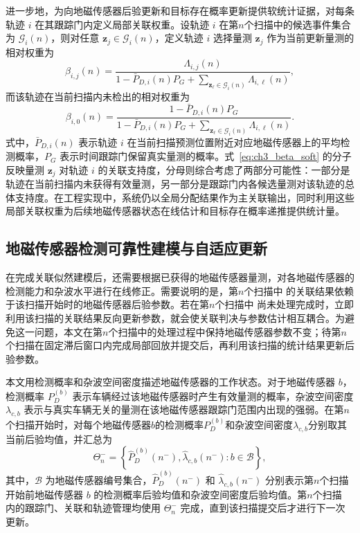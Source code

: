 \documentclass{xdupgthesis}
\begin{document}
进一步地，为向地磁传感器后验更新和目标存在概率更新提供软统计证据，对每条轨迹 $i$ 在其跟踪门内定义局部关联权重。设轨迹 $i$ 在第$n$个扫描中的候选事件集合为 $\mathcal G_i(n)$，则对任意 $\mathbf z_j\in\mathcal G_i(n)$，定义轨迹 $i$ 选择量测 $\mathbf z_j$ 作为当前更新量测的相对权重为
\begin{equation}
	\beta_{i,j}(n)=
	\frac{\Lambda_{i,j}(n)}{1-\bar P_{D,i}(n)P_G+\sum\limits_{\mathbf z_\ell\in\mathcal G_i(n)}\Lambda_{i,\ell}(n)},
	\label{eq:ch3_beta_soft}
\end{equation}
而该轨迹在当前扫描内未检出的相对权重为
\begin{equation}
	\beta_{i,0}(n)=
	\frac{1-\bar P_{D,i}(n)P_G}{1-\bar P_{D,i}(n)P_G+\sum\limits_{\mathbf z_\ell\in\mathcal G_i(n)}\Lambda_{i,\ell}(n)}.
	\label{eq:ch3_beta_miss}
\end{equation}
式中，$\bar P_{D,i}(n)$ 表示轨迹 $i$ 在当前扫描预测位置附近对应地磁传感器上的平均检测概率，$P_G$ 表示时间跟踪门保留真实量测的概率。式~\eqref{eq:ch3_beta_soft} 的分子反映量测 $\mathbf z_j$ 对轨迹 $i$ 的关联支持度，分母则综合考虑了两部分可能性：一部分是轨迹在当前扫描内未获得有效量测，另一部分是跟踪门内各候选量测对该轨迹的总体支持度。在工程实现中，系统仍以全局分配结果作为主关联输出，同时利用这些局部关联权重为后续地磁传感器状态在线估计和目标存在概率递推提供统计量。

\subsection{地磁传感器检测可靠性建模与自适应更新}
\label{subsec:ch3_node_stats}

在完成关联似然建模后，还需要根据已获得的地磁传感器量测，对各地磁传感器的检测能力和杂波水平进行在线修正。需要说明的是，第$n$个扫描中 的关联结果依赖于该扫描开始时的地磁传感器后验参数。若在第$n$个扫描中 尚未处理完成时，立即利用该扫描的关联结果反向更新参数，就会使关联判决与参数估计相互耦合。为避免这一问题，本文在第$n$个扫描中的处理过程中保持地磁传感器参数不变；待第$n$个扫描在固定滞后窗口内完成局部回放并提交后，再利用该扫描的统计结果更新后验参数。

本文用检测概率和杂波空间密度描述地磁传感器的工作状态。对于地磁传感器 $b$，检测概率 $P_D^{(b)}$ 表示车辆经过该地磁传感器时产生有效量测的概率，杂波空间密度 $\lambda_{c,b}$ 表示与真实车辆无关的量测在该地磁传感器跟踪门范围内出现的强弱。在第$n$个扫描开始时，对每个地磁传感器$b$的检测概率$P_D^{(b)}$和杂波空间密度$\lambda_{c,b}$分别取其当前后验均值，并汇总为
\begin{equation}
	\Theta_n^{-}
	=
	\left\{
	\hat P_D^{(b)}(n^-),\hat\lambda_{c,b}(n^-):b\in\mathcal B
	\right\},
	\label{eq:ch3_theta_frozen}
\end{equation}
其中，$\mathcal B$ 为地磁传感器编号集合，$\hat P_D^{(b)}(n^-)$ 和 $\hat\lambda_{c,b}(n^-)$ 分别表示第$n$个扫描 开始前地磁传感器 $b$ 的检测概率后验均值和杂波空间密度后验均值。第$n$个扫描 内的跟踪门、关联和轨迹管理均使用 $\Theta_n^{-}$ 完成，直到该扫描提交后才进行下一次更新。
\end{document}
